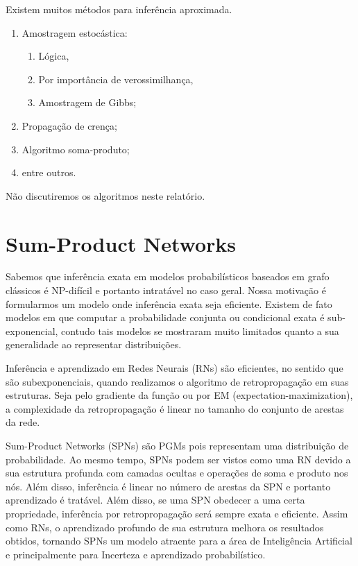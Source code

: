 \documentclass{amsart}
\theoremstyle{plain}
\numberwithin{equation}{subsection}
\begin{document}
Existem muitos métodos para inferência aproximada.

\begin{enumerate}
  \item Amostragem estocástica:
    \begin{enumerate}
      \item Lógica,
      \item Por importância de verossimilhança,
      \item Amostragem de Gibbs;
    \end{enumerate}
  \item Propagação de crença;
  \item Algoritmo soma-produto;
  \item entre outros.
\end{enumerate}

Não discutiremos os algoritmos neste relatório.

\section{Sum-Product Networks}

Sabemos que inferência exata em modelos probabilísticos baseados em grafo clássicos é NP-difícil e
portanto intratável no caso geral. Nossa motivação é formularmos um modelo onde inferência exata
seja eficiente. Existem de fato modelos em que computar a probabilidade conjunta ou condicional
exata é sub-exponencial, contudo tais modelos se mostraram muito limitados quanto a sua
generalidade ao representar distribuições.

Inferência e aprendizado em Redes Neurais (RNs) são eficientes, no sentido que são subexponenciais,
quando realizamos o algoritmo de retropropagação em suas estruturas. Seja pelo gradiente da função
ou por EM (expectation-maximization), a complexidade da retropropagação é linear no tamanho do
conjunto de arestas da rede.

Sum-Product Networks (SPNs) são PGMs pois representam uma distribuição de probabilidade. Ao mesmo
tempo, SPNs podem ser vistos como uma RN devido a sua estrutura profunda com camadas ocultas e
operações de soma e produto nos nós. Além disso, inferência é linear no número de arestas da SPN e
portanto aprendizado é tratável. Além disso, se uma SPN obedecer a uma certa propriedade,
inferência por retropropagação será sempre exata e eficiente. Assim como RNs, o aprendizado
profundo de sua estrutura melhora os resultados obtidos, tornando SPNs um modelo atraente para a
área de Inteligência Artificial e principalmente para Incerteza e aprendizado probabilístico.
\end{document}
